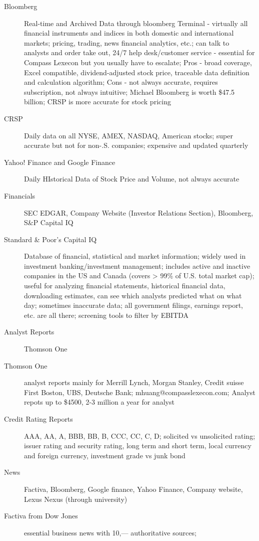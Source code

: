 \documentclass[11pt]{article}
\begin{document}
\begin{description}
\item[Bloomberg]
  Real-time and Archived Data through bloomberg Terminal - virtually all financial instruments and indices in both domestic and international markets;
  pricing, trading, news financial analytics, etc.;
  can talk to analysts and order take out, 24/7 help desk/customer service - essential for Compass Lexecon but you usually have to escalate;
  Pros - broad coverage, Excel compatible, dividend-adjusted stock price, traceable data definition and calculation algorithm;
  Cons - not always accurate, requires subscription, not always intuitive;
  Michael Bloomberg is worth \$47.5 billion;
  CRSP is more accurate for stock pricing
\item[CRSP]
  Daily data on all NYSE, AMEX, NASDAQ, American stocks;
  super accurate but not for non-.S. companies;
  expensive and updated quarterly
\item[Yahoo! Finance and Google Finance]
  Daily HIstorical Data of Stock Price and Volume, not always accurate
\item[Financials]
  SEC EDGAR, Company Website (Investor Relations Section), Bloomberg, S\&P Capital IQ
\item[Standard \& Poor's Capital IQ]
  Database of financial, statistical and market information;
  widely used in investment banking/investment management;
  includes active and inactive companies in the US and Canada (covers > 99\% of U.S. total market cap);
  useful for analyzing financial statements, historical financial data, downloading estimates, can see which analysts predicted what on what day;
  sometimes inaccurate data;
  all government filings, earnings report, etc. are all there;
  screening tools to filter by EBITDA
\item[Analyst Reports]
  Thomson One
\item[Thomson One]
  analyst reports mainly for Merrill Lynch, Morgan Stanley, Credit suisse First Boston, UBS, Deutsche Bank;
  mhuang@compasslexecon.com;
  Analyst repots up to \$4500, 2-3 million a year for analyst
\item[Credit Rating Reports]
  AAA, AA, A, BBB, BB, B, CCC, CC, C, D;
  solicited vs unsolicited rating;
  issuer rating and security rating, long term and short term, local currency and foreign currency, investment grade vs junk bond
\item[News]
  Factiva, Bloomberg, Google finance, Yahoo Finance, Company website, Lexus Nexus (through university)
\item[Factiva from Dow Jones]
  essential business news with 10,--- authoritative sources;

\end{description}
\end{document}
